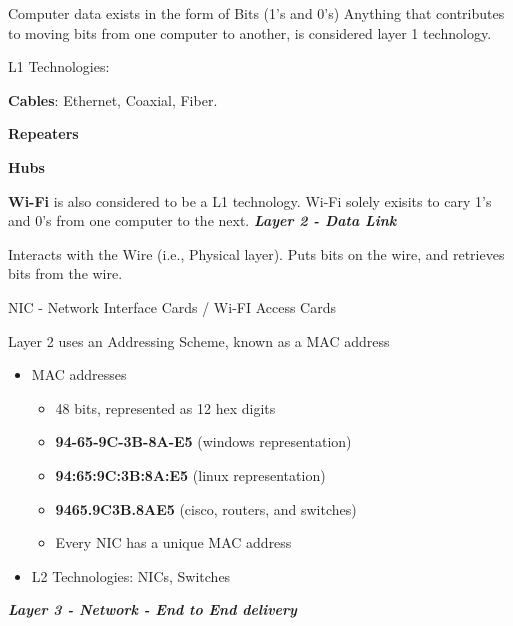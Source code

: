 \documentclass{report}
\begin{document}
\noindent       Computer data exists in the form of Bits (1's and 0's)
Anything that contributes to moving bits from one computer to another, is considered layer 1 technology. \vspace{1.5mm}

\noindent L1 Technologies: \vspace{1.5mm}

\noindent\textbf{Cables}: Ethernet, Coaxial, Fiber. \vspace{1.5mm}

\noindent \textbf{Repeaters}  \vspace{1.5mm}

\noindent \textbf{Hubs} \vspace{1.5mm}

\noindent \textbf{Wi-Fi} is also considered to be a L1 technology. Wi-Fi solely exisits to cary 1's and 0's from one computer to the next. \vspace{1.5mm}
\bigbreak \noindent
\textit{\textbf{Layer 2 - Data Link}} \vspace{1.5mm}

\noindent Interacts with the Wire (i.e., Physical layer). Puts bits on the wire, and retrieves bits from the wire. \vspace{2.5mm}

\noindent NIC - Network Interface Cards / Wi-FI Access Cards \vspace{2.5mm}

\noindent Layer 2 uses an Addressing Scheme, known as a MAC address
\begin{itemize}
  \item MAC addresses
  \begin{itemize}[label=$\circ$]
    \item 48 bits, represented as 12 hex digits
    \item \textbf{94-65-9C-3B-8A-E5} (windows representation)
    \item \textbf{94:65:9C:3B:8A:E5} (linux representation)
    \item \textbf{9465.9C3B.8AE5} (cisco, routers, and switches)
    \item Every NIC has a unique MAC address
       
  \end{itemize}
\item L2 Technologies: NICs, Switches
\end{itemize}

\bigbreak \noindent
\textit{\textbf{Layer 3 - Network - End to End delivery}} \vspace{2.5mm}
\end{document}
